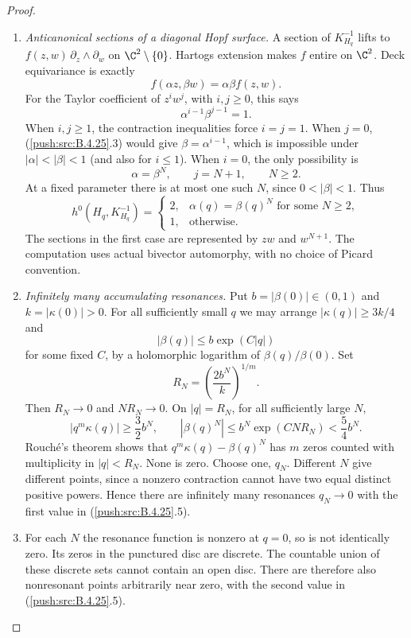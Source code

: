 \begin{proof}
\begin{enumerate}[label=\arabic*.,leftmargin=*]
\item \emph{Anticanonical sections of a diagonal Hopf surface.}
A section of $K_{H_q}^{-1}$ lifts to
$f(z,w)\,\partial_z\wedge\partial_w$ on
$\C^2\setminus\{0\}$. Hartogs extension makes $f$
entire on $\C^2$. Deck equivariance is exactly
\[
 f(\alpha z,\beta w)=\alpha\beta f(z,w).
                                                        \tag{B.4.25.2}
\]
For the Taylor coefficient of $z^i w^j$, with $i,j\ge0$,
this says
\[
 \alpha^{i-1}\beta^{j-1}=1.                             \tag{B.4.25.3}
\]
When $i,j\ge1$, the contraction inequalities force
$i=j=1$. When $j=0$, (\ref{push:src:B.4.25}.3) would give
$\beta=\alpha^{i-1}$, which is impossible under
$|\alpha|<|\beta|<1$ (and also for $i\le1$).
When $i=0$, the only possibility is
\[
 \alpha=\beta^N,\qquad j=N+1,\qquad N\ge2.
                                                        \tag{B.4.25.4}
\]
At a fixed parameter there is at most one such $N$,
since $0<|\beta|<1$. Thus
\[
 h^0(H_q,K_{H_q}^{-1})=
 \begin{cases}
 2,&\alpha(q)=\beta(q)^N\text{ for some }N\ge2,\\
 1,&\text{otherwise}.
 \end{cases}                                           \tag{B.4.25.5}
\]
The sections in the first case are represented by
$zw$ and $w^{N+1}$. The computation uses actual
bivector automorphy, with no choice of Picard convention.

\item \emph{Infinitely many accumulating resonances.}
Put $b=|\beta(0)|\in(0,1)$ and $k=|\kappa(0)|>0$.
For all sufficiently small $q$ we may arrange
$|\kappa(q)|\ge3k/4$ and
\[
 |\beta(q)|\le b\exp(C|q|)
\]
for some fixed $C$, by a holomorphic logarithm of
$\beta(q)/\beta(0)$. Set
\[
 R_N=\left(\frac{2b^N}{k}\right)^{1/m}.
\]
Then $R_N\to0$ and $N R_N\to0$. On $|q|=R_N$, for
all sufficiently large $N$,
\[
 |q^m\kappa(q)|\ge\frac32 b^N,
 \qquad |\beta(q)^N|\le b^N\exp(CN R_N)<\frac54 b^N.
\]
Rouch\'e's theorem shows that
$q^m\kappa(q)-\beta(q)^N$ has $m$ zeros counted with
multiplicity in $|q|<R_N$. None is zero. Choose one,
$q_N$. Different $N$ give different points, since a
nonzero contraction cannot have two equal distinct
positive powers. Hence there are infinitely many
resonances $q_N\to0$ with the first value in
(\ref{push:src:B.4.25}.5).

\item For each $N$ the resonance function is nonzero at
$q=0$, so is not identically zero. Its zeros in the
punctured disc are discrete. The countable union of
these discrete sets cannot contain an open disc.
There are therefore also nonresonant points arbitrarily
near zero, with the second value in (\ref{push:src:B.4.25}.5).


\end{enumerate}
\end{proof}
